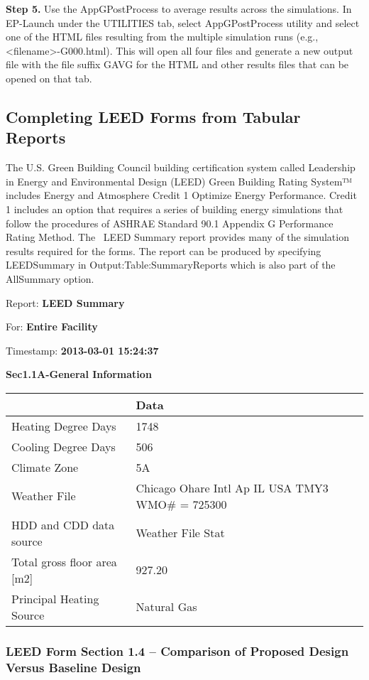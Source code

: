 \textbf{Step 5.} Use the AppGPostProcess to average results across the simulations. In EP-Launch under the UTILITIES tab, select AppGPostProcess utility and select one of the HTML files resulting from the multiple simulation runs (e.g., \textless{}filename\textgreater{}-G000.html). This will open all four files and generate a new output file with the file suffix GAVG for the HTML and other results files that can be opened on that tab.

\subsection{Completing LEED Forms from Tabular Reports}\label{completing-leed-forms-from-tabular-reports}

The U.S. Green Building Council building certification system called Leadership in Energy and Environmental Design (LEED) Green Building Rating System™ includes Energy and Atmosphere Credit 1 Optimize Energy Performance. Credit 1 includes an option that requires a series of building energy simulations that follow the procedures of ASHRAE Standard 90.1 Appendix G Performance Rating Method. The~ LEED Summary report provides many of the simulation results required for the forms. The report can be produced by specifying LEEDSummary in Output:Table:SummaryReports which is also part of the AllSummary option.

Report: \textbf{LEED Summary}

For: \textbf{Entire Facility}

Timestamp: \textbf{2013-03-01 15:24:37}

\textbf{Sec1.1A-General Information}

\begin{longtable}[c]{p{2.16in}p{3.84in}}
\toprule 
 & Data \tabularnewline \midrule
\endhead
Heating Degree Days & 1748 \tabularnewline
Cooling Degree Days & 506 \tabularnewline
Climate Zone & 5A \tabularnewline
Weather File & Chicago Ohare Intl Ap IL USA TMY3 WMO\# = 725300 \tabularnewline
HDD and CDD data source & Weather File Stat \tabularnewline
Total gross floor area [m2] & 927.20 \tabularnewline
Principal Heating Source & Natural Gas \tabularnewline
\bottomrule
\end{longtable}

\subsubsection{LEED Form Section 1.4 -- Comparison of Proposed Design Versus Baseline Design}\label{leed-form-section-1.4-comparison-of-proposed-design-versus-baseline-design}

